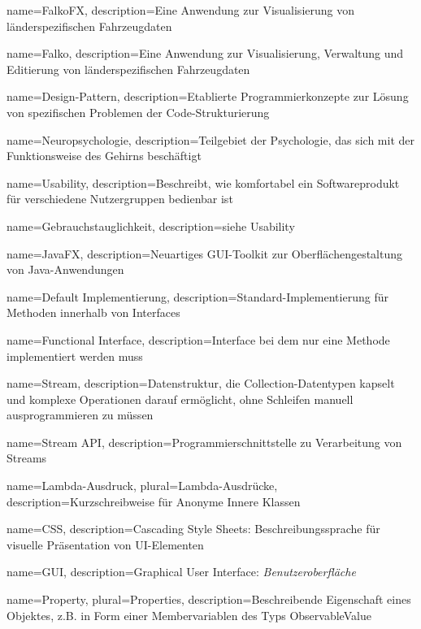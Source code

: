  {
	name=FalkoFX,
	description={Eine Anwendung zur Visualisierung von länderspezifischen Fahrzeugdaten}
}

 {
	name=Falko,
	description={Eine Anwendung zur Visualisierung, Verwaltung und Editierung von länderspezifischen Fahrzeugdaten}
}

 {
	name=Design-Pattern,
	description={Etablierte Programmierkonzepte zur Lösung von spezifischen Problemen der Code-Strukturierung}
}

 {
	name=Neuropsychologie,
	description={Teilgebiet der Psychologie, das sich mit der Funktionsweise des Gehirns beschäftigt}
}

 {
	name=Usability,
	description={Beschreibt, wie komfortabel ein Softwareprodukt für verschiedene Nutzergruppen bedienbar ist}
}

 {
	name=Gebrauchstauglichkeit,
	description={siehe Usability}
}

 {
	name=JavaFX,
	description={Neuartiges GUI-Toolkit zur Oberflächengestaltung von Java-Anwendungen}
}

 {
	name=Default Implementierung,
	description={Standard-Implementierung für Methoden innerhalb von Interfaces}
}

 {
	name=Functional Interface,
	description={Interface bei dem nur eine Methode implementiert werden muss}
}

 {
	name=Stream,
	description={Datenstruktur, die Collection-Datentypen kapselt und komplexe Operationen darauf ermöglicht, ohne Schleifen manuell ausprogrammieren zu müssen}
}

 {
	name=Stream API,
	description={Programmierschnittstelle zu Verarbeitung von Streams}
}

 {
	name=Lambda-Ausdruck,
	plural=Lambda-Ausdrücke,
	description={Kurzschreibweise für Anonyme Innere Klassen}
}

 {
	name=CSS,
	description={Cascading Style Sheets: Beschreibungssprache für visuelle Präsentation von UI-Elementen}
}

 {
	name=GUI,
	description={Graphical User Interface: \textit{Benutzeroberfläche}}
}

 {
	name=Property,
	plural=Properties,
	description={Beschreibende Eigenschaft eines Objektes, z.B. in Form einer Membervariablen des Typs ObservableValue}
}

